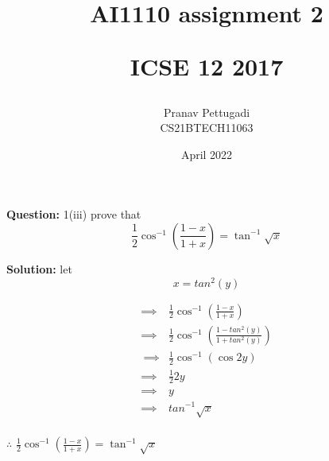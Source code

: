 \documentclass[journal,12pt,twocolumn]{IEEEtran}
\title{AI1110 assignment 2 

ICSE 12 2017}
\author{Pranav Pettugadi

CS21BTECH11063}
\date{April 2022}
\begin{document}


\providecommand{\brak}[1]{\ensuremath{\left(#1\right)}}
\providecommand{\lbrak}[1]{\ensuremath{\left(#1\right.}}
\providecommand{\rbrak}[1]{\ensuremath{\left.#1\right)}}

\newcommand{\question}{\noindent \textbf{Question: }}	
\newcommand{\solution}{\noindent \textbf{Solution: }}
\maketitle
\question {1(iii)} prove that $$\frac{1}{2}\cos^{-1}\brak{\frac{1-x}{1+x}} = \tan^{-1}{\sqrt{x}}$$

\solution
let$$ x= tan^2(y)$$

\begin{align*}
\implies&\frac{1}{2}\cos^{-1}\brak{\frac{1-x}{1+x}}\\
\implies&\frac{1}{2}\cos^{-1}\brak{\frac{1-tan^2(y)}{1+tan^2(y)}}\\\
\implies&\frac{1}{2}\cos^{-1}({\cos{2y}})\\
\implies&\frac{1}{2} 2y\\
\implies&y\\
\implies&tan^{-1}\sqrt{x}\\
\end{align*}

$\therefore$ $\frac{1}{2}\cos^{-1}\brak{\frac{1-x}{1+x}} = \tan^{-1}{\sqrt{x}}$
\end{document}

